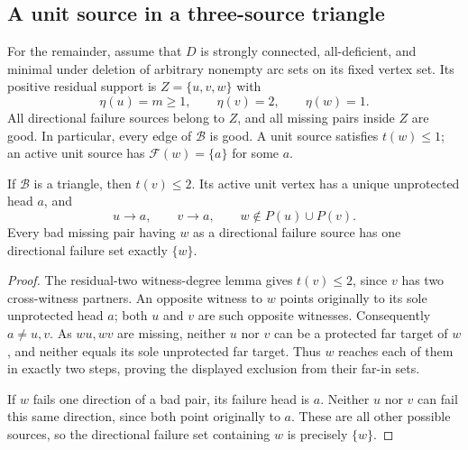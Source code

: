 \subsection{A unit source in a three-source triangle}

For the remainder, assume that $D$ is strongly connected,
all-deficient, and minimal under deletion of arbitrary nonempty arc
sets on its fixed vertex set.  Its positive residual support is
$Z=\{u,v,w\}$ with
\[
 \eta(u)=m\ge1,\qquad \eta(v)=2,\qquad \eta(w)=1.
\]
All directional failure sources belong to $Z$, and all missing pairs
inside $Z$ are good.  In particular, every edge of $\mathcal B$ is
good.  A unit source satisfies $t(w)\le1$; an active unit source has
$\mathcal F(w)=\{a\}$ for some $a$.

\begin{lemma}
\label{lem:unit-head-witness-triangle}
If $\mathcal B$ is a triangle, then $t(v)\le2$.  Its active unit
vertex has a unique unprotected head $a$, and
\[
 u\to a,\qquad v\to a,\qquad
 w\notin P(u)\cup P(v).
\]
Every bad missing pair having $w$ as a directional failure source
has one directional failure set exactly $\{w\}$.
\end{lemma}
\begin{proof}
The residual-two witness-degree lemma gives $t(v)\le2$, since $v$
has two cross-witness partners.  An opposite witness to $w$ points
originally to its sole unprotected head $a$; both $u$ and $v$ are
such opposite witnesses.  Consequently $a\ne u,v$.  As $wu,wv$ are
missing, neither $u$ nor $v$ can be a protected far target of $w$,
and neither equals its sole unprotected far target.  Thus $w$ reaches
each of them in exactly two steps, proving the displayed exclusion
from their far-in sets.

If $w$ fails one direction of a bad pair, its failure head is $a$.
Neither $u$ nor $v$ can fail this same direction, since both point
originally to $a$.  These are all other possible sources, so the
directional failure set containing $w$ is precisely $\{w\}$.
\end{proof}

